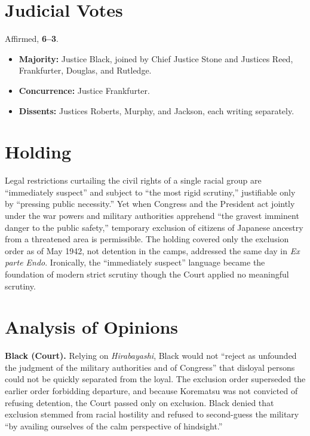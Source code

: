 \documentclass[12pt]{article}
\begin{document}
\section{Judicial Votes}

Affirmed, \textbf{6--3}.
\begin{itemize}
\item \textbf{Majority:} Justice Black, joined by Chief Justice Stone and Justices Reed, Frankfurter, Douglas, and Rutledge.
\item \textbf{Concurrence:} Justice Frankfurter.
\item \textbf{Dissents:} Justices Roberts, Murphy, and Jackson, each writing separately.
\end{itemize}

\section{Holding}

Legal restrictions curtailing the civil rights of a single racial group are ``immediately suspect'' and subject to ``the most rigid scrutiny,'' justifiable only by ``pressing public necessity.'' Yet when Congress and the President act jointly under the war powers and military authorities apprehend ``the gravest imminent danger to the public safety,'' temporary exclusion of citizens of Japanese ancestry from a threatened area is permissible. The holding covered only the exclusion order as of May 1942, not detention in the camps, addressed the same day in \textit{Ex parte Endo}. Ironically, the ``immediately suspect'' language became the foundation of modern strict scrutiny though the Court applied no meaningful scrutiny.

\section{Analysis of Opinions}

\textbf{Black (Court).} Relying on \textit{Hirabayashi}, Black would not ``reject as unfounded the judgment of the military authorities and of Congress'' that disloyal persons could not be quickly separated from the loyal. The exclusion order superseded the earlier order forbidding departure, and because Korematsu was not convicted of refusing detention, the Court passed only on exclusion. Black denied that exclusion stemmed from racial hostility and refused to second-guess the military ``by availing ourselves of the calm perspective of hindsight.''
\end{document}
